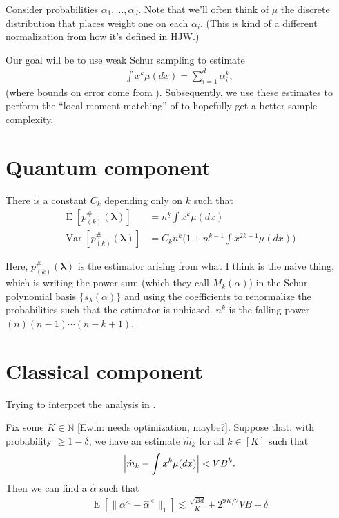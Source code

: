 \documentclass{article}
\theoremstyle{definition}
\DeclareMathOperator{\E}{E}
\DeclareMathOperator{\Var}{Var}
\DeclarePairedDelimiter{\abs}{\lvert}{\rvert}
\newcommand{\ewin}[1]{\textrm{\textcolor[RGB]{0,135,219}{[Ewin: #1]}}}
\begin{document}
Consider probabilities $\alpha_1,\ldots,\alpha_d$.
Note that we'll often think of $\mu$ the discrete distribution that places weight one on each $\alpha_i$.
(This is kind of a different normalization from how it's defined in HJW.)

Our goal will be to use weak Schur sampling to estimate
\begin{align*}
    \int x^k \mu(dx) = \sum_{i=1}^d \alpha_i^k,
\end{align*}
(where bounds on error come from \cite{aisw19}).
Subsequently, we use these estimates to perform the ``local moment matching'' of \cite{hjw18} to hopefully get a better sample complexity.

\section{Quantum component}

\begin{lemma}
    There is a constant $C_k$ depending only on $k$ such that
    \begin{align}
        \E[p_{(k)}^{\#}(\bm{\lambda})] &= n^{\underline{k}}\int x^k\mu(dx) \\
        \Var[p_{(k)}^{\#}(\bm{\lambda})] &= C_k n^{k}\Big(1 + n^{k - 1}\int x^{2k-1}\mu(dx)\Big)
    \end{align}
\end{lemma}

Here, $p_{(k)}^\#(\bm{\lambda})$ is the estimator arising from what I think is the naive thing, which is writing the power sum (which they call $M_k(\alpha)$) in the Schur polynomial basis $\{s_\lambda(\alpha)\}$ and using the coefficients to renormalize the probabilities such that the estimator is unbiased. $n^{\underline{k}}$ is the falling power $(n)(n-1)\cdots(n-k+1)$.

\section{Classical component}

Trying to interpret the analysis in \cite{hjw18}.

\begin{theorem}
Fix some $K \in \mathbb{N}$ \ewin{needs optimization, maybe?}.
Suppose that, with probability $\geq 1-\delta$, we have an estimate $\hat{m}_k$ for all $k \in [K]$ such that
\begin{align*}
    \abs[\Big]{\hat{m}_k - \int x^k \mu(dx)} < VB^k.
\end{align*}
Then we can find a $\hat{\alpha}$ such that
\begin{align*}
    \E[\|\alpha^< - \hat{\alpha}^<\|_1] \lesssim \frac{\sqrt{Bd}}{K} + 2^{9K/2}VB + \delta
\end{align*}
\end{theorem}
\end{document}
